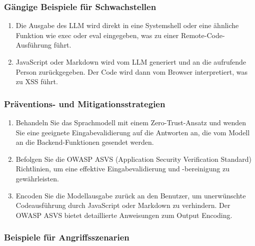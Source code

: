 \documentclass[
]{article}
\providecommand{\tightlist}{%
  \setlength{\itemsep}{0pt}\setlength{\parskip}{0pt}}
\begin{document}
\subsubsection{Gängige Beispiele für
Schwachstellen}\label{guxe4ngige-beispiele-fuxfcr-schwachstellen}

\begin{enumerate}
\def\labelenumi{\arabic{enumi}.}
\tightlist
\item
  Die Ausgabe des LLM wird direkt in eine Systemshell oder eine ähnliche
  Funktion wie exec oder eval eingegeben, was zu einer
  Remote-Code-Ausführung führt.
\item
  JavaScript oder Markdown wird vom LLM generiert und an die aufrufende
  Person zurückgegeben. Der Code wird dann vom Browser interpretiert,
  was zu XSS führt.
\end{enumerate}

\subsubsection{Präventions- und
Mitigationsstrategien}\label{pruxe4ventions--und-mitigationsstrategien}

\begin{enumerate}
\def\labelenumi{\arabic{enumi}.}
\tightlist
\item
  Behandeln Sie das Sprachmodell mit einem Zero-Trust-Ansatz und wenden
  Sie eine geeignete Eingabevalidierung auf die Antworten an, die vom
  Modell an die Backend-Funktionen gesendet werden.
\item
  Befolgen Sie die OWASP ASVS (Application Security Verification
  Standard) Richtlinien, um eine effektive Eingabevalidierung und
  -bereinigung zu gewährleisten.
\item
  Encoden Sie die Modellausgabe zurück an den Benutzer, um unerwünschte
  Codeausführung durch JavaScript oder Markdown zu verhindern. Der OWASP
  ASVS bietet detaillierte Anweisungen zum Output Encoding.
\end{enumerate}

\subsubsection{Beispiele für
Angriffsszenarien}\label{beispiele-fuxfcr-angriffsszenarien}
\end{document}
